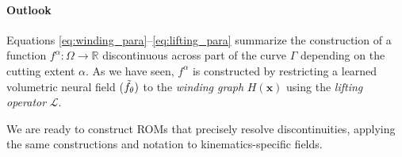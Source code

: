 \paragraph{Outlook}
Equations \ref{eq:winding_para}--\ref{eq:lifting_para} summarize the construction of a  function $f^\alpha : \Omega\rightarrow \mathbb{R}$ discontinuous across part of the curve $\Gamma$ depending on the cutting extent $\alpha$. As we have seen, $f^\alpha$ is constructed by restricting a learned volumetric neural field ($\Tilde{f}_\theta)$ to the \emph{winding graph} $H(\mathbf{x})$ using the \emph{lifting operator} $\mathcal{L}$.

We are ready to construct ROMs that precisely resolve discontinuities, applying the same constructions and notation to kinematics-specific fields.






  
